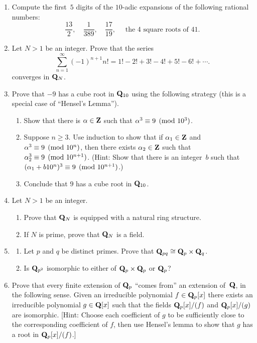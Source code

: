 \begin{enumerate}
\item\label{ex:padic0}
Compute the first~$5$ digits of the $10$-adic expansions of the following
rational numbers:
$$ 
 \frac{13}{2}, \quad \frac{1}{389}, \quad \frac{17}{19}, 
 \quad \text{ the 4 square roots of $41$}.
$$

\item\label{ex:padic1}
Let $N>1$ be an integer.  Prove that the series
$$
  \sum_{n=1}^{\infty} (-1)^{n+1}n! = 1! - 2! + 3! - 4! + 5! - 6! + \cdots.
$$
converges in $\mathbf{Q}_N$.

\item\label{ex:padic2}
Prove that $-9$ has a cube root in $\mathbf{Q}_{10}$ using the following strategy (this
is a special case of ``Hensel's Lemma'').

\begin{enumerate}
\item Show that there is $\alpha\in\mathbf{Z}$ such that $\alpha^3\equiv 9\pmod{10^3}$. 
\item Suppose $n\geq 3$. 
Use induction to show that if $\alpha_1\in\mathbf{Z}$ and 
$\alpha^3\equiv 9\pmod{10^n}$,  then there exists $\alpha_2\in\mathbf{Z}$ such 
that $\alpha_2^3\equiv 9\pmod{10^{n+1}}$.
(Hint: Show that there is an integer~$b$ such that
$(\alpha_1 + b10^{n})^3 \equiv 9\pmod{10^{n+1}}$.)
\item Conclude that $9$ has a cube root in $\mathbf{Q}_{10}$.
\end{enumerate}

\item\label{ex:padic4}
Let $N>1$ be an integer.  
\begin{enumerate}
\item Prove that $\mathbf{Q}_N$ is equipped with a natural ring structure.
\item If $N$ is prime, prove that $\mathbf{Q}_N$ is a field.
\end{enumerate}


\item\label{ex:padic3}
\begin{enumerate}
\item Let $p$ and $q$ be distinct primes.  Prove that 
$\mathbf{Q}_{pq} \cong \mathbf{Q}_p \times \mathbf{Q}_q$.
\item Is $\mathbf{Q}_{p^2}$ isomorphic to either of $\mathbf{Q}_p\times \mathbf{Q}_p$ or $\mathbf{Q}_p$?
\end{enumerate}


\item\label{ques:approxfield} Prove that every finite extension of
  $\mathbf{Q}_p$ ``comes from'' an extension of~$\mathbf{Q}$, in the following sense.
  Given an irreducible polynomial $f\in\mathbf{Q}_p[x]$ there exists an
  irreducible polynomial $g\in \mathbf{Q}[x]$ such that the fields
  $\mathbf{Q}_p[x]/(f)$ and $\mathbf{Q}_p[x]/(g)$ are isomorphic.  [Hint: Choose each
  coefficient of $g$ to be sufficiently close to the corresponding
  coefficient of $f$, then use Hensel's lemma to show that $g$ has a
  root in $\mathbf{Q}_p[x]/(f)$.]


\end{enumerate}
